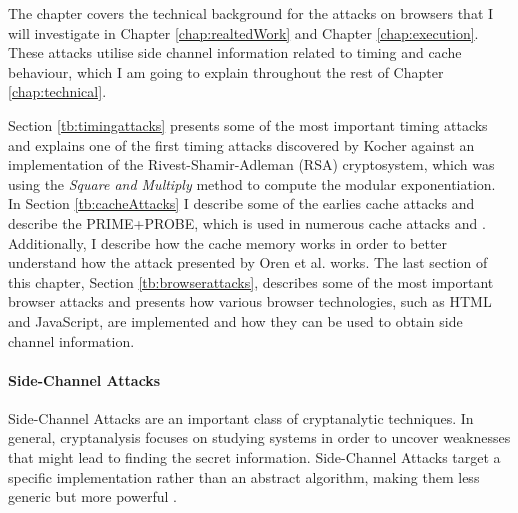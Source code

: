 \documentclass[10pt,a4paper,twoside]{book}
\begin{document}

The chapter covers the technical background for the attacks on browsers that I will investigate in Chapter \ref{chap:realtedWork} and Chapter \ref{chap:execution}. These attacks utilise side channel information related to timing and cache behaviour, which I am going to explain throughout the rest of Chapter \ref{chap:technical}. 

Section \ref{tb:timingattacks} presents some of the most important timing attacks and explains one of the first timing attacks discovered by Kocher\cite{kocher1996timing} against an implementation of the Rivest-Shamir-Adleman (RSA) \cite{rivest1978method} cryptosystem, which was using the \textit{Square and Multiply}\cite{menezes1996handbook} method to compute the modular exponentiation. In Section \ref{tb:cacheAttacks} I describe some of the earlies cache attacks and describe the PRIME+PROBE\cite{osvik2006cache}, which is used in numerous cache attacks \cite{osvik2006cache} and \cite{oren2015spy}. Additionally, I describe how the cache memory works in order to better understand how the attack presented by Oren et al.\cite{oren2015spy} works. The last section of this chapter, Section \ref{tb:browserattacks}, describes some of the most important browser attacks and presents how various browser technologies, such as HTML and JavaScript, are implemented and how they can be used to obtain side channel information.

\paragraph{Side-Channel Attacks}

Side-Channel Attacks are an important class of cryptanalytic techniques. In general, cryptanalysis focuses on studying systems in order to uncover weaknesses that might lead to finding the secret information. Side-Channel Attacks target a specific implementation rather than an abstract algorithm, making them less generic but more powerful \cite{standaert2010introduction}.
\end{document}
